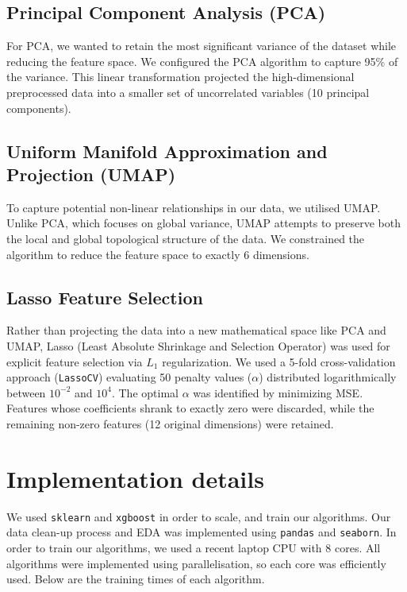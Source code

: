 \documentclass{article}
\begin{document}
\subsection{Principal Component Analysis (PCA)}
For PCA, we wanted to retain the most significant variance of the dataset while reducing the feature space. We configured the PCA algorithm to capture 95\% of the variance. This linear transformation projected the high-dimensional preprocessed data into a smaller set of uncorrelated variables (10 principal components).

\subsection{Uniform Manifold Approximation and Projection (UMAP)}
To capture potential non-linear relationships in our data, we utilised UMAP. Unlike PCA, which focuses on global variance, UMAP attempts to preserve both the local and global topological structure of the data. We constrained the algorithm to reduce the feature space to exactly 6 dimensions. 

\subsection{Lasso Feature Selection}
Rather than projecting the data into a new mathematical space like PCA and UMAP, Lasso (Least Absolute Shrinkage and Selection Operator) was used for explicit feature selection via $L_1$ regularization. We used a 5-fold cross-validation approach (\texttt{LassoCV}) evaluating 50 penalty values ($\alpha$) distributed logarithmically between $10^{-2}$ and $10^4$. The optimal $\alpha$ was identified by minimizing MSE. Features whose coefficients shrank to exactly zero were discarded, while the remaining non-zero features (12 original dimensions) were retained. 

\section{Implementation details}

We used \texttt{sklearn} and \texttt{xgboost} in order to scale, and train our algorithms. 
Our data clean-up process and EDA was implemented using \texttt{pandas} and \texttt{seaborn}.
In order to train our algorithms, we used a recent laptop CPU with 8 cores. All algorithms were implemented using parallelisation, so each core was efficiently used. Below are the training times of each algorithm.
\end{document}
